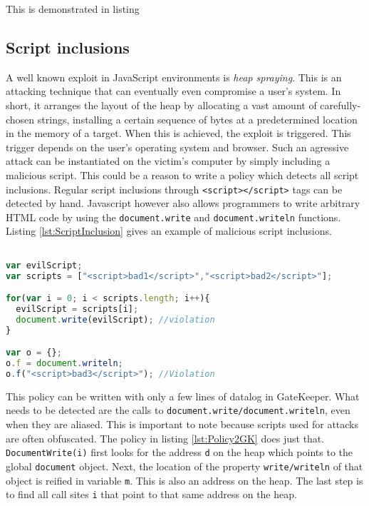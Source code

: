  This is demonstrated in listing 

\subsection{Script inclusions}

A well known exploit in JavaScript environments is \textit{heap spraying}. This is an attacking technique that can eventually even compromise a user's system. In short, it arranges the layout of the heap by allocating a vast amount of carefully-chosen strings, installing a certain sequence of bytes at a predetermined location in the memory of a target. When this is achieved, the exploit is triggered. This trigger depends on the user's operating system and browser. Such an agressive attack can be instantiated on the victim's computer by simply including a malicious script. This could be a reason to write a policy which detects all script inclusions. Regular script inclusions through \texttt{<script></script>} tags can be detected by hand. Javascript however also allows programmers to write arbitrary HTML code by using the \texttt{document.write} and \texttt{document.writeln} functions. Listing \ref{lst:ScriptInclusion} gives an example of malicious script inclusions.

\begin{lstlisting}[label={lst:Policy2GK},language=JavaScript,caption=Script inclusion example,mathescape=true]  % float=t?

var evilScript;
var scripts = ["<script>bad1</script>","<script>bad2</script>"];

for(var i = 0; i < scripts.length; i++){
  evilScript = scripts[i];
  document.write(evilScript); //violation
}

var o = {};
o.f = document.writeln;
o.f("<script>bad3</script>"); //Violation
\end{lstlisting}

This policy can be written with only a few lines of datalog in GateKeeper. What needs to be detected are the calls to \texttt{document.write/document.writeln}, even when they are aliased. This is important to note because scripts used for attacks are often obfuscated. The policy in listing \ref{lst:Policy2GK} does just that. \texttt{DocumentWrite(i)} first looks for the address \texttt{d} on the heap which points to the global \texttt{document} object. Next, the location of the property \texttt{write/writeln} of that object is reified in variable \texttt{m}. This is also an address on the heap. The last step is to find all call sites \texttt{i} that point to that same address on the heap. 

